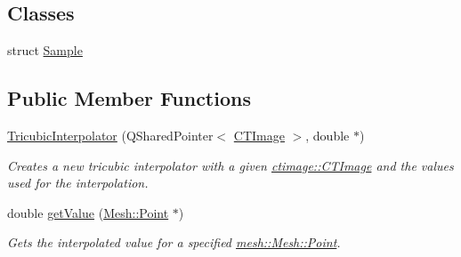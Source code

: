 \subsection*{Classes}
\begin{DoxyCompactItemize}
\item 
struct \hyperlink{structassignment_1_1_tricubic_interpolator_1_1_sample}{Sample}
\end{DoxyCompactItemize}
\subsection*{Public Member Functions}
\begin{DoxyCompactItemize}
\item 
\hyperlink{classassignment_1_1_tricubic_interpolator_ac582527ae93e8532fafb7bbc75a14f6c}{TricubicInterpolator} (QSharedPointer$<$ \hyperlink{classctimage_1_1_c_t_image}{CTImage} $>$, double $\ast$)
\begin{DoxyCompactList}\small\item\em Creates a new tricubic interpolator with a given \hyperlink{classctimage_1_1_c_t_image}{ctimage::CTImage} and the values used for the interpolation. \item\end{DoxyCompactList}\item 
double \hyperlink{classassignment_1_1_tricubic_interpolator_ac06870dcde750c17f2d7ce02b87cbd9c}{getValue} (\hyperlink{structmesh_1_1_mesh_1_1_point}{Mesh::Point} $\ast$)
\begin{DoxyCompactList}\small\item\em Gets the interpolated value for a specified \hyperlink{structmesh_1_1_mesh_1_1_point}{mesh::Mesh::Point}. \item\end{DoxyCompactList}\end{DoxyCompactItemize}
